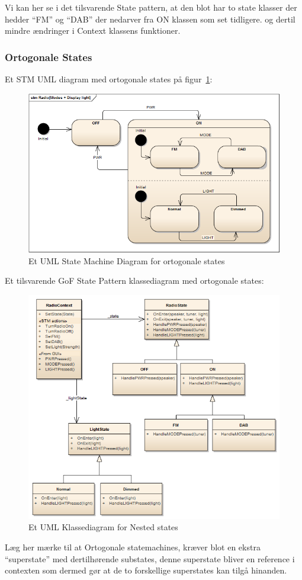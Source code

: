 Vi kan her se i det tilsvarende State pattern, at den blot har to state klasser der hedder “FM” og “DAB” der nedarver fra ON klassen som set tidligere. og dertil mindre ændringer i Context klassens funktioner. %

\subsubsection{Ortogonale States}
Et STM UML diagram med ortogonale states på figur~\ref{fig:umlOrtogonalState}:

\begin{figure}[H]
	\centering
	\includegraphics[width=\linewidth]{figs/state/RadioModesDisplayLight}
	\caption{Et UML State Machine Diagram for ortogonale states}
	\label{fig:umlOrtogonalState}
\end{figure}

Et tilsvarende GoF State Pattern klassediagram med ortogonale states:

\begin{figure}[H]
	\centering
	\includegraphics[width=\linewidth]{figs/state/RadioOrthogonal_SP}
	\caption{Et UML Klassediagram for Nested states}
	\label{fig:UMLClassOrtogonalState}
\end{figure}

Læg her mærke til at Ortogonale statemachines, kræver blot en ekstra “superstate” med dertilhørende substates, denne superstate bliver en reference i contexten som dermed gør at de to forskellige superstates kan tilgå hinanden.

